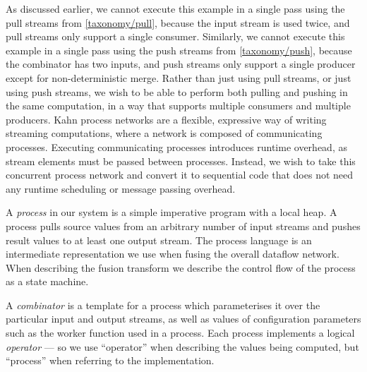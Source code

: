 
As discussed earlier, we cannot execute this example in a single pass using the pull streams from \cref{taxonomy/pull}, because the \lstiproc@stock@ input stream is used twice, and pull streams only support a single consumer.
Similarly, we cannot execute this example in a single pass using the push streams from \cref{taxonomy/push}, because the \lstiproc@join@ combinator has two inputs, and push streams only support a single producer except for non-deterministic merge.
Rather than just using pull streams, or just using push streams, we wish to be able to perform both pulling and pushing in the same computation, in a way that supports multiple consumers and multiple producers.
Kahn process networks \citep{kahn1976coroutines} are a flexible, expressive way of writing streaming computations, where a network is composed of communicating processes.
Executing communicating processes introduces runtime overhead, as stream elements must be passed between processes.
Instead, we wish to take this concurrent process network and convert it to sequential code that does not need any runtime scheduling or message passing overhead.

%

A \emph{process} in our system is a simple imperative program with a local heap.
A process pulls source values from an arbitrary number of input streams and pushes result values to at least one output stream.
The process language is an intermediate representation we use when fusing the overall dataflow network.
When describing the fusion transform we describe the control flow of the process as a state machine.

A \emph{combinator} is a template for a process which parameterises it over the particular input and output streams, as well as values of configuration parameters such as the worker function used in a \lstiproc@map@ process.
Each process implements a logical \emph{operator} --- so we use ``operator'' when describing the values being computed, but ``process'' when referring to the implementation.


